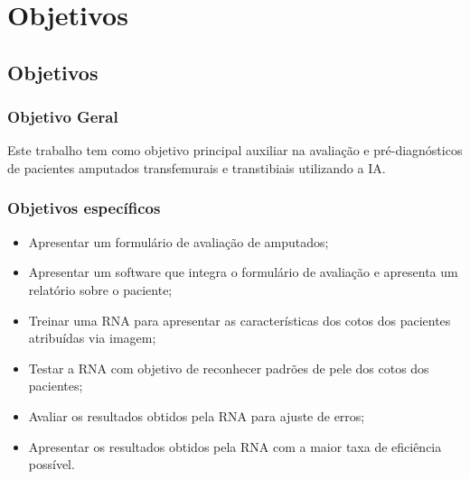 \part{Objetivos}
\chapter[Objetivos]{Objetivos}

\section{Objetivo Geral}
    Este trabalho tem como objetivo principal auxiliar na avaliação e pré-diagnósticos de pacientes amputados transfemurais e transtibiais utilizando a IA.


\section{Objetivos específicos}
    \begin{itemize}
        \item Apresentar um formulário de avaliação de amputados;
        \item Apresentar um software que integra o formulário de avaliação e apresenta um relatório sobre o paciente;
        \item Treinar uma RNA para apresentar as características dos cotos dos pacientes atribuídas via imagem;
        \item Testar a RNA com objetivo de reconhecer padrões de pele dos cotos dos pacientes;
        \item Avaliar os resultados obtidos pela RNA para ajuste de erros;
        \item Apresentar os resultados obtidos pela RNA com a maior taxa de eficiência possível.
    \end{itemize}